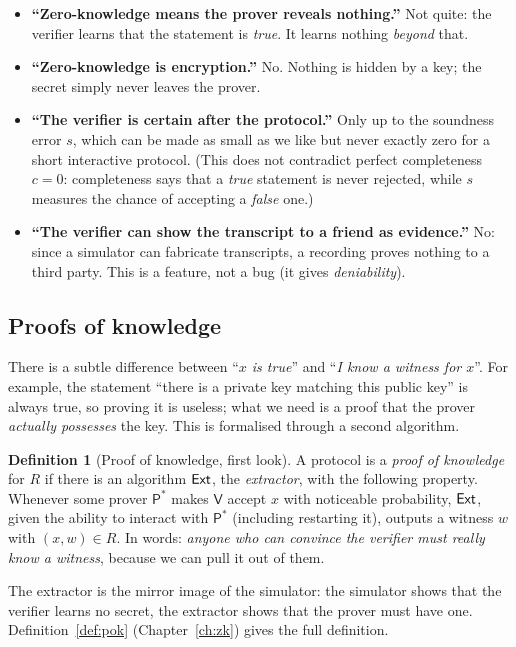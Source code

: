 \documentclass[11pt,a4paper]{report}
\theoremstyle{plain}
\theoremstyle{definition}
\newtheorem{definition}[theorem]{Definition}
\theoremstyle{remark}
\newcommand{\Prv}{\mathsf{P}}\newcommand{\Ver}{\mathsf{V}}
\begin{document}
\begin{warning}
\begin{itemize}
\item \textbf{``Zero-knowledge means the prover reveals nothing.''} Not quite: the verifier learns that the statement is \emph{true}. It learns nothing \emph{beyond} that.
\item \textbf{``Zero-knowledge is encryption.''} No. Nothing is hidden by a key; the secret simply never leaves the prover.
\item \textbf{``The verifier is certain after the protocol.''} Only up to the soundness error $s$, which can be made as small as we like but never exactly zero for a short interactive protocol. (This does not contradict perfect completeness $c=0$: completeness says that a \emph{true} statement is never rejected, while $s$ measures the chance of accepting a \emph{false} one.)
\item \textbf{``The verifier can show the transcript to a friend as evidence.''} No: since a simulator can fabricate transcripts, a recording proves nothing to a third party. This is a feature, not a bug (it gives \emph{deniability}).
\end{itemize}
\end{warning}

\subsection{Proofs of knowledge}
There is a subtle difference between ``\emph{$x$ is true}'' and ``\emph{I know a witness for $x$}''. For example, the statement ``there is a private key matching this public key'' is always true, so proving it is useless; what we need is a proof that the prover \emph{actually possesses} the key. This is formalised through a second algorithm.

\begin{definition}[Proof of knowledge, first look]\label{def:intro-pok}
A protocol is a \emph{proof of knowledge} for $R$ if there is an algorithm $\mathsf{Ext}$, the \emph{extractor}, with the following property. Whenever some prover $\Prv^*$ makes $\Ver$ accept $x$ with noticeable probability, $\mathsf{Ext}$, given the ability to interact with $\Prv^*$ (including restarting it), outputs a witness $w$ with $(x,w)\in R$. In words: \emph{anyone who can convince the verifier must really know a witness}, because we can pull it out of them.
\end{definition}
The extractor is the mirror image of the simulator: the simulator shows that the verifier learns no secret, the extractor shows that the prover must have one. Definition~\ref{def:pok} (Chapter~\ref{ch:zk}) gives the full definition.
\end{document}
